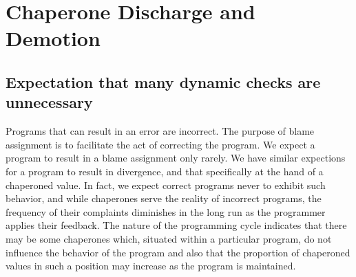 \documentclass{sigplanconf}
\begin{document}




\section{Chaperone Discharge and Demotion}

\subsection{Expectation that many dynamic checks are unnecessary}

Programs that can result in an error are incorrect.
The purpose of blame assignment is to facilitate the act of correcting the program.
We expect a program to result in a blame assignment only rarely.
We have similar expections for a program to result in divergence, and that specifically at the hand of a chaperoned value.
In fact, we expect correct programs never to exhibit such behavior, and while chaperones serve the reality of incorrect programs, the frequency of their complaints diminishes in the long run as the programmer applies their feedback.
The nature of the programming cycle indicates that there may be some chaperones which, situated within a particular program, do not influence the behavior of the program and also that the proportion of chaperoned values in such a position may increase as the program is maintained.
\end{document}
